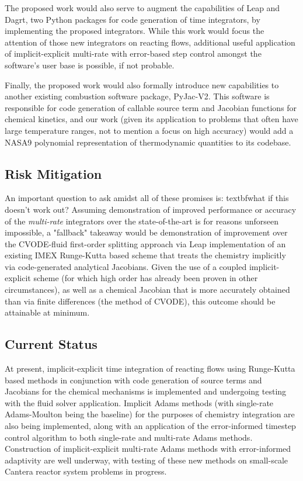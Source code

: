 The proposed work would also serve to augment the capabilities of Leap and Dagrt,
two Python packages for code generation of time integrators, by implementing the
proposed integrators. While this work would focus the attention of those new
integrators on reacting flows, additional useful application of implicit-explicit multi-rate
with error-based step control amongst the software's user base is possible, if not
probable.

Finally, the proposed work would also formally introduce new capabilities
to another existing combustion software package, PyJac-V2. This software is
responsible for code generation of callable source term and Jacobian functions
for chemical kinetics, and our work (given its application to problems that
often have large temperature ranges, not to mention a focus on high accuracy)
would add a NASA9 polynomial representation of thermodynamic quantities to
its codebase.

\subsection{Risk Mitigation}

An important question to ask amidst all of these promises is: 
textbf{what if this doesn't work out?} Assuming demonstration of improved
performance or accuracy of the \emph{multi-rate} integrators over the
state-of-the-art is for reasons unforseen impossible, a "fallback" takeaway
would be demonstration of improvement over the CVODE-fluid first-order splitting
approach via Leap implementation of an existing IMEX Runge-Kutta based scheme
that treats the chemistry implicitly via code-generated analytical Jacobians.
Given the use of a coupled implicit-explicit scheme (for which high order has
already been proven in other circumstances), as well as a chemical Jacobian
that is more accurately obtained than via finite differences (the method
of CVODE), this outcome should be attainable at minimum.

\subsection{Current Status}

At present, implicit-explicit time integration of reacting flows using Runge-Kutta
based methods in conjunction with code generation of source terms and Jacobians for
the chemical mechanisms is implemented and undergoing testing with the fluid solver
application. Implicit Adams methods (with single-rate Adams-Moulton being the baseline)
for the purposes of chemistry integration are also being implemented, along with
an application of the error-informed timestep control algorithm to both
single-rate and multi-rate Adams methods. Construction of implicit-explicit multi-rate
Adams methods with error-informed adaptivity are well underway, with testing
of these new methods on small-scale Cantera reactor system problems in progress.


